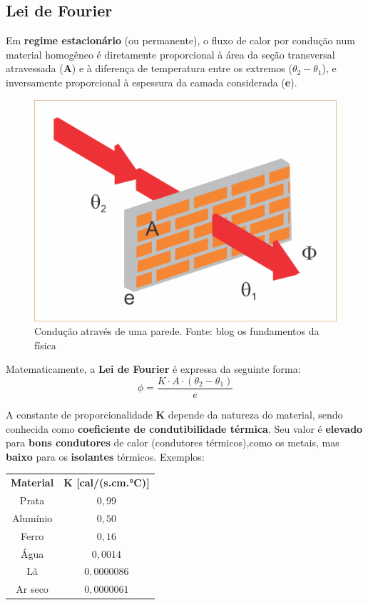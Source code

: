 \documentclass[12pt,twoside]{article}
\begin{document}
\hypertarget{x-lei-de-fourier}{\subsection{Lei de Fourier}}
Em \textbf{regime estacionário} (ou permanente), o fluxo de calor por condução num material homogêneo é diretamente proporcional à área da seção transversal atravessada (\textbf{A}) e à diferença de temperatura entre os extremos (\textbf{$\theta_{2}-\theta_{1}$}), e inversamente proporcional à espessura da camada considerada (\textbf{e}).


\begin{figure}[ht]{}
\centering\includegraphics[width=2.5truein]{parede.png}
\caption{Condução através de uma parede. Fonte: blog os fundamentos da física}

\end{figure}

Matematicamente, a \textbf{Lei de Fourier} é expressa da seguinte forma: \[\phi=\dfrac{K\cdot A\cdot(\theta_{2}-\theta_{1})}{e}\]


A constante de proporcionalidade \textbf{K} depende da natureza do material, sendo conhecida como \textbf{coeficiente de condutibilidade térmica}. Seu valor é \textbf{elevado} para \textbf{bons condutores} de calor (condutores térmicos),como os metais, mas \textbf{baixo} para os \textbf{isolantes} térmicos. Exemplos:


\begin{center}
\begin{tabular}{|c|c|}
\hline
\textbf{Material} & \textbf{K [cal/(s.cm.°C)]} \\ 
Prata & $0,99$ \\ 
Alumínio & $0,50$ \\ 
Ferro & $0,16$ \\ 
Água & $0,0014$ \\ 
Lã & $0,0000086$ \\ 
Ar seco & $0,0000061$ \\ 
\hline
\end{tabular}
\end{center}
\end{document}
